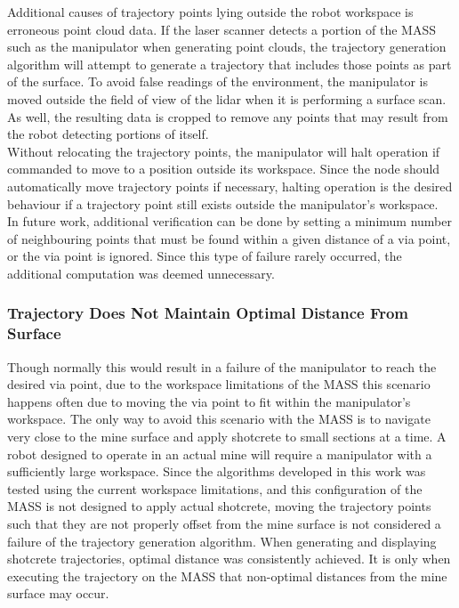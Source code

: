 Additional causes of trajectory points lying outside the robot workspace is erroneous point cloud data. If the laser scanner detects a portion of the MASS such as the manipulator when generating point clouds, the trajectory generation algorithm will attempt to generate a trajectory that includes those points as part of the surface. To avoid false readings of the environment, the manipulator is moved outside the field of view of the \acrshort{lidar} when it is performing a surface scan. As well, the resulting data is cropped to remove any points that may result from the robot detecting portions of itself.\\

Without relocating the trajectory points, the manipulator will halt operation if commanded to move to a position outside its workspace. Since the  node should automatically move trajectory points if necessary, halting operation is the desired behaviour if a trajectory point still exists outside the manipulator's workspace.\\

In future work, additional verification can be done by setting a minimum number of neighbouring points that must be found within a given distance of a via point, or the via point is ignored. Since this type of failure rarely occurred, the additional computation was deemed unnecessary.\\

\subsubsection{Trajectory Does Not Maintain Optimal Distance From Surface}

Though normally this would result in a failure of the manipulator to reach the desired via point, due to the workspace limitations of the MASS this scenario happens often due to moving the via point to fit within the manipulator's workspace. The only way to avoid this scenario with the MASS is to navigate very close to the mine surface and apply shotcrete to small sections at a time. A robot designed to operate in an actual mine will require a manipulator with a sufficiently large workspace. Since the algorithms developed in this work was tested using the current workspace limitations, and this configuration of the MASS is not designed to apply actual shotcrete, moving the trajectory points such that they are not properly offset from the mine surface is not considered a failure of the trajectory generation algorithm. When generating and displaying shotcrete trajectories, optimal distance was consistently achieved. It is only when executing the trajectory on the MASS that non-optimal distances from the mine surface may occur.\\

